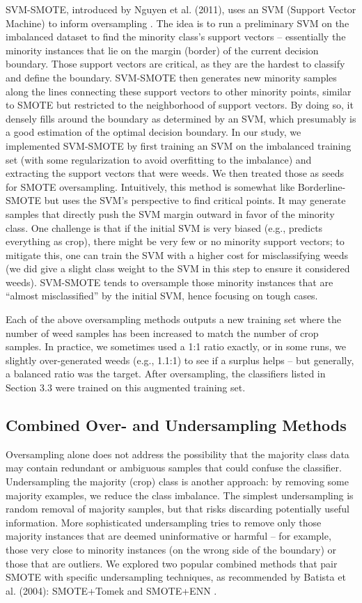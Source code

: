\documentclass[agriengineering,article,submit,pdftex,moreauthors]{Definitions/mdpi}
\begin{document}
SVM-SMOTE,  introduced by Nguyen et al. (2011), uses an SVM (Support Vector Machine) to inform oversampling \cite{Nguyen2011-cb}. The idea is to run a preliminary SVM on the imbalanced dataset to find the minority class’s support vectors – essentially the minority instances that lie on the margin (border) of the current decision boundary. Those support vectors are critical, as they are the hardest to classify and define the boundary. SVM-SMOTE then generates new minority samples along the lines connecting these support vectors to other minority points, similar to SMOTE but restricted to the neighborhood of support vectors. By doing so, it densely fills around the boundary as determined by an SVM, which presumably is a good estimation of the optimal decision boundary. In our study, we implemented SVM-SMOTE by first training an SVM on the imbalanced training set (with some regularization to avoid overfitting to the imbalance) and extracting the support vectors that were weeds. We then treated those as seeds for SMOTE oversampling. Intuitively, this method is somewhat like Borderline-SMOTE but uses the SVM’s perspective to find critical points. It may generate samples that directly push the SVM margin outward in favor of the minority class. One challenge is that if the initial SVM is very biased (e.g., predicts everything as crop), there might be very few or no minority support vectors; to mitigate this, one can train the SVM with a higher cost for misclassifying weeds (we did give a slight class weight to the SVM in this step to ensure it considered weeds). SVM-SMOTE tends to oversample those minority instances that are “almost misclassified” by the initial SVM, hence focusing on tough cases.

Each of the above oversampling methods outputs a new training set where the number of weed samples has been increased to match the number of crop samples. In practice, we sometimes used a 1:1 ratio exactly, or in some runs, we slightly over-generated weeds (e.g., 1.1:1) to see if a surplus helps – but generally, a balanced ratio was the target. After oversampling, the classifiers listed in Section 3.3 were trained on this augmented training set.

\subsection{Combined Over- and Undersampling Methods}
Oversampling alone does not address the possibility that the majority class data may contain redundant or ambiguous samples that could confuse the classifier. Undersampling the majority (crop) class is another approach: by removing some majority examples, we reduce the class imbalance. The simplest undersampling is random removal of majority samples, but that risks discarding potentially useful information. More sophisticated undersampling tries to remove only those majority instances that are deemed uninformative or harmful – for example, those very close to minority instances (on the wrong side of the boundary) or those that are outliers. We explored two popular combined methods that pair SMOTE with specific undersampling techniques, as recommended by Batista et al. (2004): SMOTE+Tomek and SMOTE+ENN \cite{Batista2004-qz}.
\end{document}
